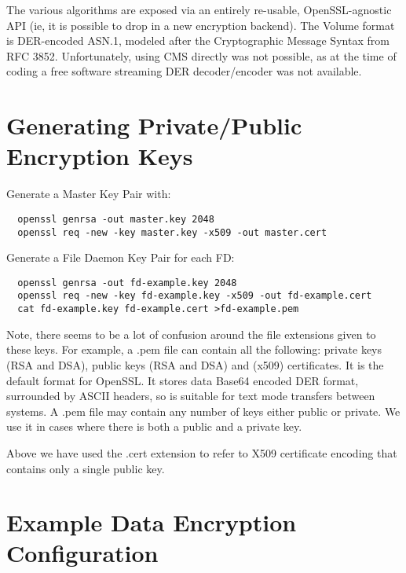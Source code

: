 The various algorithms are exposed via an entirely re-usable,
OpenSSL-agnostic API (ie, it is possible to drop in a new encryption
backend). The Volume format is DER-encoded ASN.1, modeled after the
Cryptographic Message Syntax from RFC 3852. Unfortunately, using CMS
directly was not possible, as at the time of coding a free software
streaming DER decoder/encoder was not available.




\section{Generating Private/Public Encryption Keys}

Generate a Master Key Pair with:

\footnotesize
\begin{verbatim}
  openssl genrsa -out master.key 2048
  openssl req -new -key master.key -x509 -out master.cert
\end{verbatim}
\normalsize

Generate  a File Daemon Key Pair for each FD:

\footnotesize
\begin{verbatim}
  openssl genrsa -out fd-example.key 2048
  openssl req -new -key fd-example.key -x509 -out fd-example.cert
  cat fd-example.key fd-example.cert >fd-example.pem
\end{verbatim}
\normalsize

Note, there seems to be a lot of confusion around the file extensions given
to these keys.  For example, a .pem file can contain all the following:
private keys (RSA and DSA), public keys (RSA and DSA) and (x509) certificates.
It is the default format for OpenSSL. It stores data Base64 encoded DER format,
surrounded by ASCII headers, so is suitable for text mode transfers between
systems. A .pem file may contain any number of keys either public or
private. We use it in cases where there is both a public and a private
key.

Above we have used the .cert extension to refer to X509
certificate encoding that contains only a single public key.


\section{Example Data Encryption Configuration}

